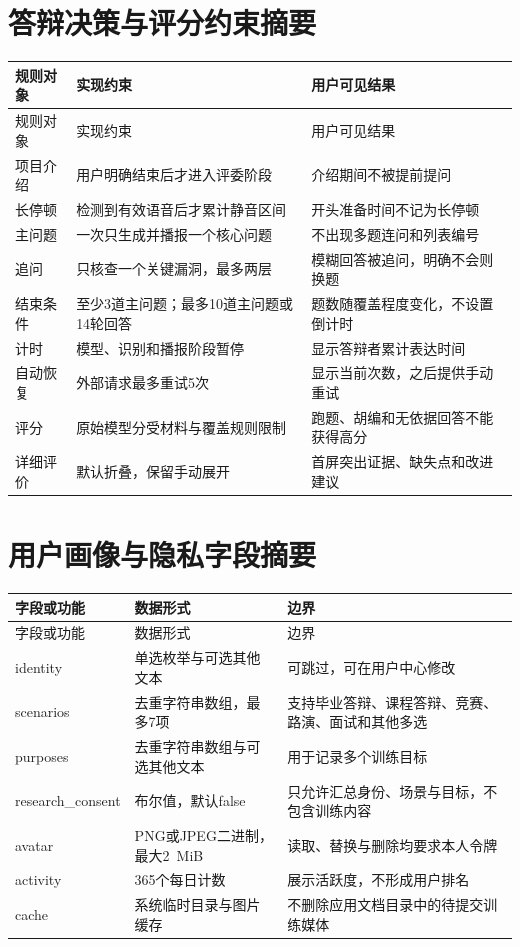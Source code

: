\chapter{答辩决策与评分约束摘要}
\begin{longtable}{>{\raggedright\arraybackslash}p{4.0cm}>{\raggedright\arraybackslash}p{4.8cm}p{5.9cm}}
\toprule 规则对象 & 实现约束 & 用户可见结果 \\
\midrule
\endfirsthead
\toprule 规则对象 & 实现约束 & 用户可见结果 \\
\midrule
\endhead
项目介绍 & 用户明确结束后才进入评委阶段 & 介绍期间不被提前提问 \\
长停顿 & 检测到有效语音后才累计静音区间 & 开头准备时间不记为长停顿 \\
主问题 & 一次只生成并播报一个核心问题 & 不出现多题连问和列表编号 \\
追问 & 只核查一个关键漏洞，最多两层 & 模糊回答被追问，明确不会则换题 \\
结束条件 & 至少3道主问题；最多10道主问题或14轮回答 & 题数随覆盖程度变化，不设置倒计时 \\
计时 & 模型、识别和播报阶段暂停 & 显示答辩者累计表达时间 \\
自动恢复 & 外部请求最多重试5次 & 显示当前次数，之后提供手动重试 \\
评分 & 原始模型分受材料与覆盖规则限制 & 跑题、胡编和无依据回答不能获得高分 \\
详细评价 & 默认折叠，保留手动展开 & 首屏突出证据、缺失点和改进建议 \\
\bottomrule
\end{longtable}

\chapter{用户画像与隐私字段摘要}
\begin{longtable}{>{\raggedright\arraybackslash}p{4.0cm}>{\raggedright\arraybackslash}p{4.7cm}p{6.0cm}}
\toprule 字段或功能 & 数据形式 & 边界 \\
\midrule
\endfirsthead
\toprule 字段或功能 & 数据形式 & 边界 \\
\midrule
\endhead
identity & 单选枚举与可选其他文本 & 可跳过，可在用户中心修改 \\
scenarios & 去重字符串数组，最多7项 & 支持毕业答辩、课程答辩、竞赛、路演、面试和其他多选 \\
purposes & 去重字符串数组与可选其他文本 & 用于记录多个训练目标 \\
research\_consent & 布尔值，默认false & 只允许汇总身份、场景与目标，不包含训练内容 \\
avatar & PNG或JPEG二进制，最大2~MiB & 读取、替换与删除均要求本人令牌 \\
activity & 365个每日计数 & 展示活跃度，不形成用户排名 \\
cache & 系统临时目录与图片缓存 & 不删除应用文档目录中的待提交训练媒体 \\
\bottomrule
\end{longtable}

